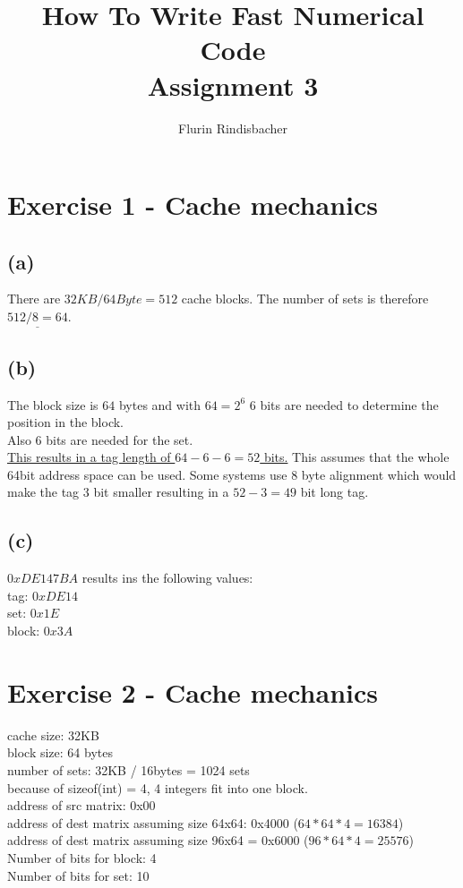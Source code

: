 \documentclass[10pt,a4paper,oneside,notitlepage]{report}
\author{Flurin Rindisbacher}
\title{How To Write Fast Numerical Code \\ \vspace{6 mm} \textbf{Assignment 3}}
\begin{document}
\maketitle

\section*{Exercise 1 - Cache mechanics}
\subsection*{(a)}
There are $32KB / 64 Byte = 512$ cache blocks. The number of sets is therefore $\underline{512 / 8=64}$.

\subsection*{(b)}
The block size is $64$ bytes and with $64=2^6$ 6 bits are needed to determine the position in the block. \\
Also 6 bits are needed for the set. \\
\underline{This results in a tag length of $64 - 6 - 6=52$ bits.}
This assumes that the whole 64bit address space can be used. Some systems use 8 byte alignment which would make the tag 3 bit smaller resulting in a $52-3=49$ bit long tag.

\subsection*{(c)}
$0xDE147BA$ results ins the following values: \\
tag: $0xDE14$ \\
set: $0x1E$ \\
block: $0x3A$

\section*{Exercise 2 - Cache mechanics}
cache size: 32KB \\
block size: 64 bytes \\
number of sets: 32KB / 16bytes = 1024 sets \\
because of sizeof(int) = 4, 4 integers fit into one block. \\
address of src matrix: 0x00 \\
address of dest matrix assuming size 64x64: 0x4000 ($64*64*4=16384$) \\
address of dest matrix assuming size 96x64 = 0x6000 ($96*64*4=25576$) \\
Number of bits for block: 4 \\
Number of bits for set: 10\\
\end{document}
